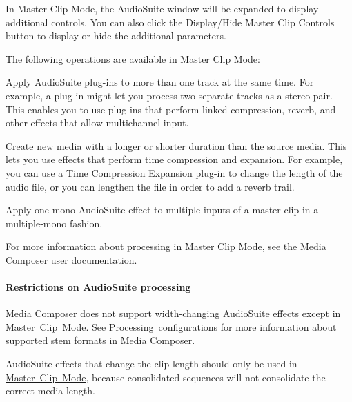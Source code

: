 In Master Clip Mode, the Audio\+Suite window will be expanded to display additional controls. You can also click the Display/\+Hide Master Clip Controls button to display or hide the additional parameters.

The following operations are available in Master Clip Mode\+: 
\begin{DoxyItemize}
\item Apply Audio\+Suite plug-\/ins to more than one track at the same time. For example, a plug-\/in might let you process two separate tracks as a stereo pair. This enables you to use plug-\/ins that perform linked compression, reverb, and other effects that allow multichannel input.  
\item Create new media with a longer or shorter duration than the source media. This lets you use effects that perform time compression and expansion. For example, you can use a Time Compression Expansion plug-\/in to change the length of the audio file, or you can lengthen the file in order to add a reverb trail.  
\item Apply one mono Audio\+Suite effect to multiple inputs of a master clip in a multiple-\/mono fashion.  
\end{DoxyItemize}

For more information about processing in Master Clip Mode, see the Media Composer user documentation.

\hypertarget{a00831_subsubsection__media_composer_guide__audiosuite_restrictions}{}\paragraph{Restrictions on Audio\+Suite processing}\label{a00831_subsubsection__media_composer_guide__audiosuite_restrictions}
 
\begin{DoxyItemize}
\item Media Composer does not support width-\/changing Audio\+Suite effects except in \mbox{\hyperlink{a00831_subsubsection__media_composer_guide__audiosuite_master_clip_mode}{Master Clip Mode}}. See \mbox{\hyperlink{a00831_subsection__aax_media_composer_guide__features__processing}{Processing configurations}} for more information about supported stem formats in Media Composer.  
\item Audio\+Suite effects that change the clip length should only be used in \mbox{\hyperlink{a00831_subsubsection__media_composer_guide__audiosuite_master_clip_mode}{Master Clip Mode}}, because consolidated sequences will not consolidate the correct media length. 
\end{DoxyItemize}

